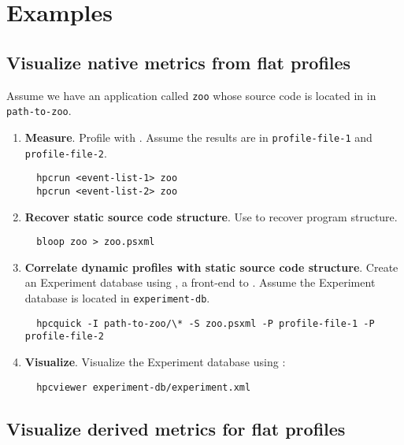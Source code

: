 \documentclass[english]{article}
\begin{document}
\section{Examples}

\subsection{Visualize native metrics from flat profiles}

Assume we have an application called \texttt{zoo} whose source code is located in in \texttt{path-to-zoo}.

\begin{enumerate}
\item \textbf{Measure}.  Profile with .  Assume the results are in \texttt{profile-file-1} and \texttt{profile-file-2}.
\begin{verbatim}
  hpcrun <event-list-1> zoo
  hpcrun <event-list-2> zoo
\end{verbatim}

\item \textbf{Recover static source code structure}. Use  to recover program structure.
\begin{verbatim}
  bloop zoo > zoo.psxml
\end{verbatim}

\item \textbf{Correlate dynamic profiles with static source code structure}.
Create an Experiment database using , a front-end to .  Assume the Experiment database is located in \texttt{experiment-db}.
\begin{verbatim}
  hpcquick -I path-to-zoo/\* -S zoo.psxml -P profile-file-1 -P profile-file-2
\end{verbatim}

\item \textbf{Visualize}.
Visualize the Experiment database using :
\begin{verbatim}
  hpcviewer experiment-db/experiment.xml
\end{verbatim}

\end{enumerate}

\subsection{Visualize derived metrics for flat profiles}
\end{document}

